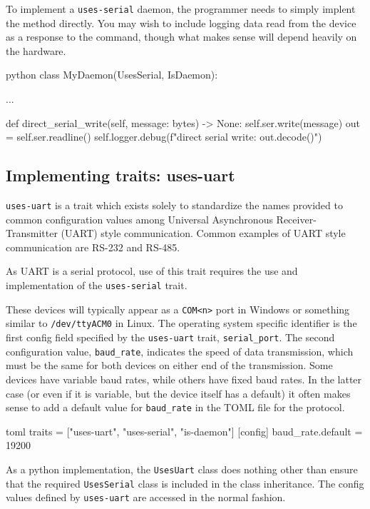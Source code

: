 To implement a \texttt{uses-serial} daemon, the programmer needs to simply implent the method directly.
You may wish to include logging data read from the device as a response to the command, though what makes sense will depend heavily on the hardware.

\begin{codefragment}{python}
class MyDaemon(UsesSerial, IsDaemon):

    ...

    def direct_serial_write(self, message: bytes) -> None:
        self.ser.write(message)
        out = self.ser.readline()
        self.logger.debug(f"direct serial write: {out.decode()}")
\end{codefragment}


\subsection{Implementing traits: uses-uart}

\texttt{uses-uart} is a trait which exists solely to standardize the names provided to common configuration values among Universal Asynchronous Receiver-Transmitter (UART) style communication.
Common examples of UART style communication are RS-232 and RS-485.

As UART is a serial protocol, use of this trait requires the use and implementation of the \texttt{uses-serial} trait.

These devices will typically appear as a \texttt{COM<n>} port in Windows or something similar to \texttt{/dev/ttyACM0} in Linux.
The operating system specific identifier is the first config field specified by the \texttt{uses-uart} trait, \texttt{serial\_port}.
The second configuration value, \texttt{baud\_rate}, indicates the speed of data transmission, which must be the same for both devices on either end of the transmission.
Some devices have variable baud rates, while others have fixed baud rates.
In the latter case (or even if it is variable, but the device itself has a default) it often makes sense to add a default value for \texttt{baud\_rate} in the TOML file for the protocol.

\begin{codefragment}{toml}\noop
traits = ["uses-uart", "uses-serial", "is-daemon"]
[config]
baud_rate.default = 19200
\end{codefragment}

As a python implementation, the \texttt{UsesUart} class does nothing other than ensure that the required \texttt{UsesSerial} class is included in the class inheritance.
The config values defined by \texttt{uses-uart} are accessed in the normal fashion.

